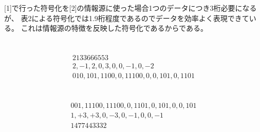 \documentclass[../../master.tex]{subfiles}
\begin{document}
\section{}
[1]で行った符号化を[2]の情報源に使った場合1つのデータにつき3桁必要になるが、
表2による符号化では1.9桁程度であるのでデータを効率よく表現できている。
これは情報源の特徴を反映した符号化であるからである。
\section{}
\begin{align}
    2133666553\\
    2, -1, 2, 0, 3, 0, 0, -1, 0, -2\\
    010, 101, 1100, 0, 11100, 0, 0, 101, 0, 1101
\end{align}
\section{}
\begin{align}
    001, 11100, 11100, 0, 1101, 0, 101, 0, 0, 101\\
    1, +3, +3, 0, -3, 0, -1, 0, 0, -1\\
    1477443332
\end{align}
\end{document}
